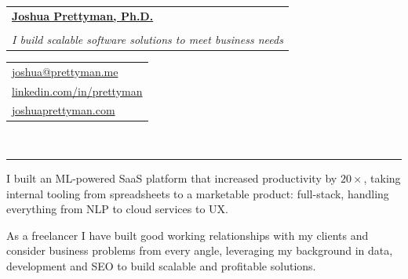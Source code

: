 \documentclass[10pt]{article}
\makeatletter
\newcommand{\makeheading}[8][]{
	\hspace*{-\marginparsep minus \marginparwidth}%
	\begin{minipage}[t]{\textwidth+\marginparwidth+\marginparsep}%
		\begin{tabular}[t]{@{}l}
		{\hspace{-8pt} \Large \bfseries#2}\\
		\\
		{\normalsize \emph{#3}}
		\end{tabular}
		\hfill
		\begin{tabular}[t]{|l}
		#4  \\
		#5  \\
		#6 \\
		
		\end{tabular}
		\vspace{1pt}
		\\[-0.2\baselineskip]%
		
		\rule{\columnwidth}{1pt}%
	\end{minipage}
}
\renewcommand{\section}[1]{
	\pagebreak[3]%
	\hyphenpenalty=10000%
	\vspace{\baselineskip}%
	\phantomsection\addcontentsline{toc}{section}{#1}%
	\noindent{\scshape #1}%
	\vspace{\baselineskip}\par
}
\newenvironment{innerlist}[1][\enskip\textbullet]{
	\begin{itemize}[#1,leftmargin=*,rightmargin=30pt,parsep=0pt,itemsep=1pt,topsep=2pt,partopsep=0pt]
}{\end{itemize}}
\providecommand*\url[1]{\href{#1}{#1}}
\renewcommand*\url[1]{\href{#1}{\texttt{#1}}}
\providecommand*\email[1]{\href{mailto:#1}{#1}}
\makeatother
\begin{document}
\makeheading{
		\href{https://joshuaprettyman.com/}{Joshua Prettyman, Ph.D.}
}
{I build scalable software solutions to meet business needs}
{\email{joshua@prettyman.me}}
{\href{https://www.linkedin.com/in/prettyman/}{linkedin.com/in/prettyman}}
{\href{https://joshuaprettyman.com/}{joshuaprettyman.com}}







\section{Personal Statement}
I built an ML-powered SaaS platform that increased productivity by $20\times$, 
taking internal tooling from spreadsheets to a marketable product: full-stack, 
handling everything from NLP to cloud services to UX. \\

\vspace{-5pt}

As a freelancer I have built good working relationships with my clients and consider business problems from every angle, leveraging my background in data, development and SEO to build scalable and profitable solutions. 

\end{document}
